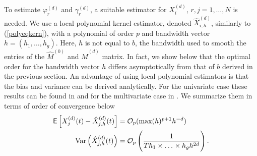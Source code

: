 To estimate $\varphi^{(d)}_r$ and $\gamma^{(d)}_r$, a suitable estimator for $X_i^{(d)}$, $r,j=1,\dots,N$ is needed. We use a local polynomial kernel estimator, denoted $\hat{X}^{(d)}_{i,h}$, similarly to (\ref{polyeqkern}), with a polynomial of order $p$ and bandwidth vector $h=(h_1,\dots,h_g)$.
Here, $h$ is not equal to $b$, the bandwidth used to smooth the entries of the $\hat{M}^{(0)}$ and $\hat{M}^{(d)}$ matrix. In fact, we show below that the optimal order for the bandwidth vector $h$ differs asymptotically from that of $b$ derived in the previous section. %
An advantage of using local polynomial estimators %
is that the bias and variance can be derived analytically. For the univariate case these results can be found in \cite{Fan:96} and for the multivariate case in \cite{Yang:15}. We summarize them in terms of order of convergence below
\begin{equation}\label{bias_var}
\begin{split}
\mathop{\mbox{\sf E}}\left[X_j^{(d)}(t)-\hat{X}^{(d)}_{j,h}(t)\right] &= \mathcal{O}_p(\max(h)^{p+1} h^{-d}) \\
\operatorname{Var}\left(\hat{X}^{(d)}_{j,h}(t)\right) &= \mathcal{O}_p\left( \frac{1}{T h_1 \times \ldots{\kern -1pt} \times h_g h^{2d}  }\right).
\end{split}
\end{equation}


